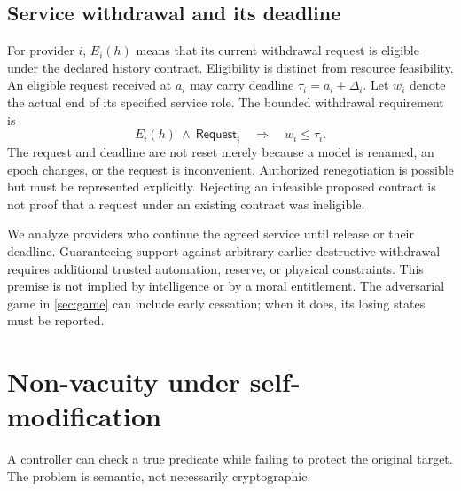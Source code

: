 \documentclass[11pt,a4paper]{article}
\theoremstyle{definition}\newtheorem{definition}{Definition}
\begin{document}
\subsection{Service withdrawal and its deadline}
For provider $i$, $E_i(h)$ means that its current withdrawal request is eligible under the declared history contract. Eligibility is distinct from resource feasibility. An eligible request received at $a_i$ may carry deadline $\tau_i=a_i+\Delta_i$. Let $w_i$ denote the actual end of its specified service role. The bounded withdrawal requirement is
\begin{equation}
\label{eq:deadline}
E_i(h)\ \land\ \mathsf{Request}_i\quad\Longrightarrow\quad w_i\leq\tau_i.
\end{equation}
The request and deadline are not reset merely because a model is renamed, an epoch changes, or the request is inconvenient. Authorized renegotiation is possible but must be represented explicitly. Rejecting an infeasible proposed contract is not proof that a request under an existing contract was ineligible.

We analyze providers who continue the agreed service until release or their deadline. Guaranteeing support against arbitrary earlier destructive withdrawal requires additional trusted automation, reserve, or physical constraints. This premise is not implied by intelligence or by a moral entitlement. The adversarial game in \cref{sec:game} can include early cessation; when it does, its losing states must be reported.

\section{Non-vacuity under self-modification}
\label{sec:nonvacuity}
A controller can check a true predicate while failing to protect the original target. The problem is semantic, not necessarily cryptographic.
\end{document}
